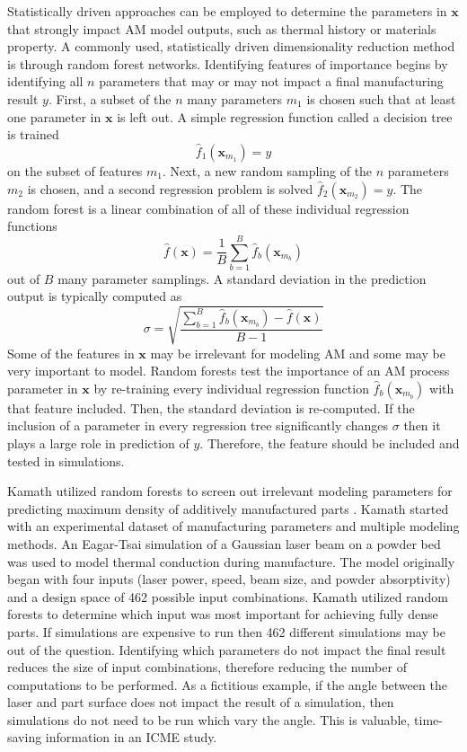 Statistically driven approaches can be employed to determine the parameters in $\mathbf{x}$ that strongly impact AM model outputs, such as thermal history or materials property. A commonly used, statistically driven dimensionality reduction method is through random forest networks. Identifying features of importance begins by identifying all $n$ parameters that may or may not impact a final manufacturing result $y$. First, a subset of the $n$ many parameters $m_1$ is chosen such that at least one parameter in $\mathbf{x}$ is left out. A simple regression function called a decision tree is trained
\begin{equation}
	\hat{f}_1(\mathbf{x}_{m_1}) = y
\end{equation}
on the subset of features $m_1$. Next, a new random sampling of the $n$ parameters $m_2$ is chosen, and a second regression problem is solved $\hat{f}_2(\mathbf{x}_{m_2}) = y$. The random forest is a linear combination of all of these individual regression functions
\begin{equation}
	\hat{f}(\mathbf{x}) = \frac{1}{B} \sum_{b=1}^{B} \hat{f}_b(\mathbf{x}_{m_b})
	\label{randomforest}
\end{equation}
out of $B$ many parameter samplings. A standard deviation in the prediction output is typically computed as
\begin{equation}
	\sigma = \sqrt{\frac{\sum_{b=1}^B \hat{f}_b(\mathbf{x}_{m_b}) - \hat{f}(\mathbf{x})}{B-1}}
	\label{rfstddev}
\end{equation}
Some of the features in $\mathbf{x}$ may be irrelevant for modeling AM and some may be very important to model. Random forests test the importance of an AM process parameter in $\mathbf{x}$ by re-training every individual regression function $\hat{f}_b(\mathbf{x}_{m_b})$ with that feature included. Then, the standard deviation is re-computed. If the inclusion of a parameter in every regression tree significantly changes $\sigma$ then it plays a large role in prediction of $y$. Therefore, the feature should be included and tested in simulations.

Kamath utilized random forests to screen out irrelevant modeling parameters for predicting maximum density of additively manufactured parts \cite{Kamath2016}. Kamath started with an experimental dataset of manufacturing parameters and multiple modeling methods. An Eagar-Tsai simulation of a Gaussian laser beam on a powder bed was used to model thermal conduction during manufacture. The model originally began with four inputs (laser power, speed, beam size, and powder absorptivity) and a design space of 462 possible input combinations. Kamath utilized random forests to determine which input was most important for achieving fully dense parts. If simulations are expensive to run then 462 different simulations may be out of the question. Identifying which parameters do not impact the final result reduces the size of input combinations, therefore reducing the number of computations to be performed. As a fictitious example, if the angle between the laser and part surface does not impact the result of a simulation, then simulations do not need to be run which vary the angle. This is valuable, time-saving information in an ICME study.

